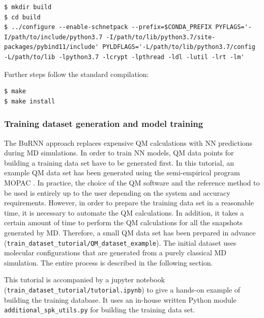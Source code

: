 \begin{lstlisting}[breaklines=true, breakatwhitespace=false, showstringspaces=false]
$ mkdir build
$ cd build
$ ../configure --enable-schnetpack --prefix=$CONDA_PREFIX PYFLAGS='-I/path/to/include/python3.7 -I/path/to/lib/python3.7/site-packages/pybind11/include' PYLDFLAGS='-L/path/to/lib/python3.7/config -L/path/to/lib -lpython3.7 -lcrypt -lpthread -ldl -lutil -lrt -lm'
\end{lstlisting}

Further steps follow the standard compilation:
\begin{lstlisting}[breaklines=true, breakatwhitespace=false]
$ make
$ make install
\end{lstlisting}


\subsubsection{Training dataset generation and model training}
The BuRNN approach replaces expensive QM calculations with NN predictions during MD simulations. In order to train NN models, QM data points for building a training data set have to be generated first. In this tutorial, an example QM data set has been generated using the semi-empirical program MOPAC \cite{Stewart1990MOPAC, Stewart2013MOPAC}. In practice, the choice of the QM software and the reference method to be used is entirely up to the user depending on the system and accuracy requirements. However, in order to prepare the training data set in a reasonable time, it is necessary to automate the QM calculations. In addition, it takes a certain amount of time to perform the QM calculations for all the snapshots generated by MD. Therefore, a small QM data set has been prepared in advance (\texttt{train\_dataset\_tutorial/QM\_dataset\_example}). The initial dataset uses molecular configurations that are generated from a purely classical MD simulation. The entire process is described in the following section.


This tutorial is accompanied by a jupyter notebook (\texttt{train\_dataset\_tutorial/tutorial.ipynb}) to give a hands-on example of building the training database. It uses an in-house written Python module {\texttt{additional\_spk\_utils.py}} for building the training data set.


